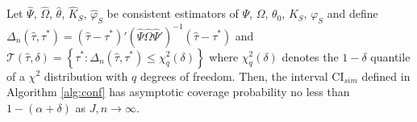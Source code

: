 \begin{thm}
\label{thm:sim}
Let $\widehat{\Psi}$, $\widehat{\Omega}$, $\widehat{\theta}$, $\widehat{K}_S$, $\widehat{\varphi}_S$ be consistent estimators of $\Psi$, $\Omega$, $\theta_0$, $K_S$, $\varphi_S$ and define 
$\Delta_n(\widehat{\tau},\tau^*) = \left(\widehat{\tau} - \tau^*\right)' (\widehat{\Psi}\widehat{\Omega}\widehat{\Psi}')^{-1} \left(\widehat{\tau} - \tau^*\right)$ 
and 
$\mathscr{T}(\widehat{\tau},\delta) = \left\{\tau^* \colon  \Delta_n(\widehat{\tau},\tau^*) \leq \chi^2_q(\delta)\right\}$
where $\chi^2_q(\delta)$ denotes the $1-\delta$ quantile of a $\chi^2$ distribution with $q$ degrees of freedom.
Then, the interval $\mbox{CI}_{sim}$ defined in Algorithm \ref{alg:conf} has asymptotic coverage probability no less than $1-(\alpha + \delta)$ as $J,n\rightarrow \infty$.
\end{thm}
